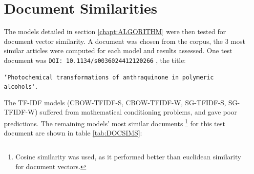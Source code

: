 \section{Document Similarities}
The models detailed in section \ref{chapt:ALGORITHM} were then tested for document vector similarity. A document was chosen from the corpus, the 3 most similar articles were computed for each model and results assessed. One test document was \texttt{DOI: 10.1134/s0036024412120266} \cite{docassay}, the title:


\texttt{`Photochemical transformations of anthraquinone in polymeric alcohols'}.

 The TF-IDF models (CBOW-TFIDF-S, CBOW-TFIDF-W, SG-TFIDF-S, SG-TFIDF-W) suffered from mathematical conditioning problems, and gave poor predictions. The remaining models' most similar documents \footnote{Cosine similarity was used, as it performed better than euclidean similarity for document vectors.} for this test document are shown in table \ref{tab:DOCSIMS}:
